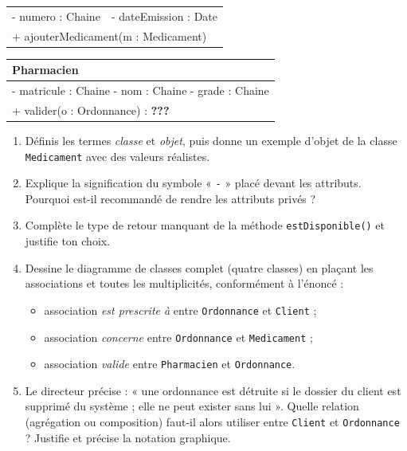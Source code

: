 \documentclass[11pt]{article}
\begin{document}
\begin{exercice}
\begin{center}
\vspace{0.4em}
\begin{tabularx}{\linewidth}{|X|X|}
\hline
\rowcolor{popblueL}\multicolumn{2}{|l|}{\textbf{Ordonnance}}\\
\hline
- numero : Chaine & - dateEmission : Date\\
\hline
\multicolumn{2}{|l|}{+ ajouterMedicament(m : Medicament)}\\
\hline
\end{tabularx}

\vspace{0.4em}
\begin{tabularx}{\linewidth}{|X|}
\hline
\rowcolor{popblueL}\textbf{Pharmacien}\\
\hline
- matricule : Chaine \quad - nom : Chaine \quad - grade : Chaine\\
\hline
+ valider(o : Ordonnance) : \textbf{???}\\
\hline
\end{tabularx}
\end{center}

\begin{enumerate}
  \item Définis les termes \emph{classe} et \emph{objet}, puis donne un exemple d'objet de la classe \texttt{Medicament} avec des valeurs réalistes.
  \item Explique la signification du symbole « \texttt{-} » placé devant les attributs. Pourquoi est-il recommandé de rendre les attributs privés ?
  \item Complète le type de retour manquant de la méthode \texttt{estDisponible()} et justifie ton choix.
  \item Dessine le diagramme de classes complet (quatre classes) en plaçant les associations et toutes les multiplicités, conformément à l'énoncé :
  \begin{itemize}
    \item association \emph{est prescrite à} entre \texttt{Ordonnance} et \texttt{Client} ;
    \item association \emph{concerne} entre \texttt{Ordonnance} et \texttt{Medicament} ;
    \item association \emph{valide} entre \texttt{Pharmacien} et \texttt{Ordonnance}.
  \end{itemize}
  \item Le directeur précise : « une ordonnance est détruite si le dossier du client est supprimé du système ; elle ne peut exister sans lui ». Quelle relation (agrégation ou composition) faut-il alors utiliser entre \texttt{Client} et \texttt{Ordonnance} ? Justifie et précise la notation graphique.
\end{enumerate}
\end{exercice}
\end{document}
